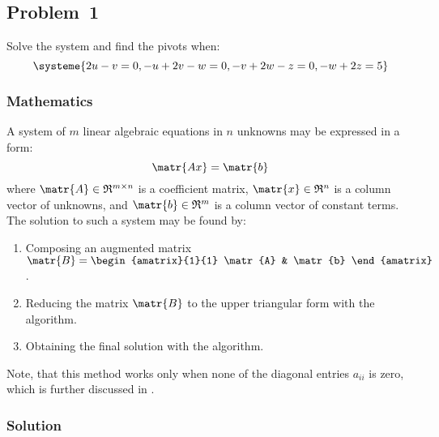 \subsection{Problem~1}%
\label{problem:1}

Solve the system and find the pivots when:
\begin{equation*}
  \systeme{2u-v=0,-u+2v-w=0,-v+2w-z=0,-w+2z=5}
\end{equation*}

\subsubsection*{Mathematics}

A system of $m$ linear algebraic equations in $n$ unknowns may be expressed in a form:
\begin{equation*}
  \matr{Ax}=\matr{b}
\end{equation*}
where $\matr{A}\in\mathfrak{R}^{m\times{}n}$ is a coefficient matrix,
$\matr{x}\in\mathfrak{R}^n$ is a column vector of unknowns,
and $\matr{b}\in\mathfrak{R}^m$ is a column vector of constant terms.
The solution to such a system may be found by:
\begin{enumerate}
  \item Composing an augmented matrix
    $\matr{B} = \begin{amatrix}{1}{1}
      \matr{A} & \matr{b}
    \end{amatrix}$.
  \item Reducing the matrix $\matr{B}$ to the upper triangular form
    with the \textit{} algorithm.
  \item Obtaining the final solution with the
    \textit{} algorithm.
\end{enumerate}

Note, that this method works only when none of the diagonal entries $a_{ii}$ is zero,
which is further discussed in .

\subsubsection*{Solution}

